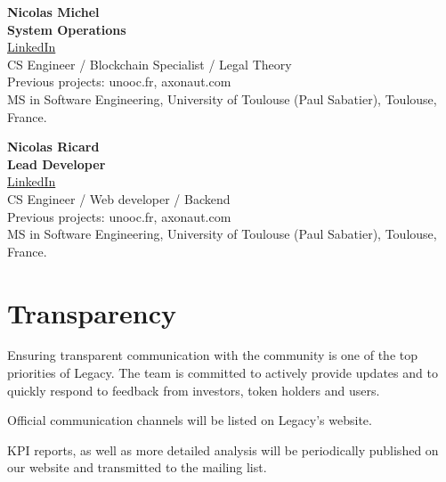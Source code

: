 \vspace{5mm} %
 
\noindent
\textbf{Nicolas Michel} \\
\textbf{System Operations} \\
\href{https://www.linkedin.com/in/michel-nicolas}{LinkedIn} \\ 
CS Engineer / Blockchain Specialist / Legal Theory \\
Previous projects: unooc.fr, axonaut.com \\
MS in Software Engineering, University of Toulouse (Paul Sabatier), Toulouse, France. \\

\vspace{5mm} %
 
\noindent 
\textbf{Nicolas Ricard} \\
\textbf{Lead Developer}  \\
\href{https://www.linkedin.com/in/nicolasricard/}{LinkedIn} \\ 
CS Engineer / Web developer / Backend \\
Previous projects: unooc.fr, axonaut.com \\
MS in Software Engineering, University of Toulouse (Paul Sabatier), Toulouse, France. \\

\section{Transparency} %
\label{sec:transparency}
Ensuring transparent communication with the community is one of the top priorities of Legacy. The team is committed to actively provide updates and to quickly respond to feedback from investors, token holders and users.

Official communication channels will be listed on Legacy’s website.

KPI reports, as well as more detailed analysis will be periodically published on our website and transmitted to the mailing list.


